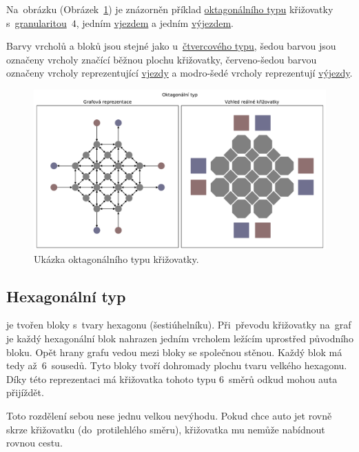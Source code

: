 Na~obrázku (Obrázek~\ref{fig:octagonal_type_graph}) je znázorněn příklad
\hyperref[subsec:oktagonali_typ]{oktagonálního typu} křižovatky s~\hyperref[par:granularita]{granularitou}~$4$,
jedním \hyperref[par:vjezdy]{vjezdem} a jedním \hyperref[par:vyjezdy]{výjezdem}.

Barvy vrcholů a bloků jsou stejné jako u~\hyperref[subsec:ctvercovy_typ]{čtvercového typu},
šedou barvou jsou označeny vrcholy značící běžnou plochu křižovatky,
červeno-šedou barvou označeny vrcholy reprezentující \hyperref[par:vjezdy]{vjezdy} a
modro-šedé vrcholy reprezentují \hyperref[par:vyjezdy]{výjezdy}.

\begin{figure}[h]
  \centering
  \includegraphics[width=\textwidth]{../img/Octagonal_grid}
  \caption{Ukázka oktagonálního typu křižovatky.}
  \label{fig:octagonal_type_graph}
\end{figure}

\subsection{Hexagonální typ}\label{subsec:hexagonalni_typ}

 je tvořen bloky s~tvary hexagonu (šestiúhelníku).
Při~převodu křižovatky na~graf je každý hexagonální blok nahrazen jedním vrcholem ležícím uprostřed původního bloku.
Opět hrany grafu vedou mezi bloky se společnou stěnou.
Každý blok má tedy až~$6$~sousedů.
Tyto bloky tvoří dohromady plochu tvaru velkého hexagonu.
Díky této reprezentaci má křižovatka tohoto typu $6$~směrů odkud mohou auta přijíždět.

Toto rozdělení sebou nese jednu velkou nevýhodu.
Pokud chce auto jet rovně skrze křižovatku (do~protilehlého směru), křižovatka mu nemůže nabídnout rovnou cestu.

